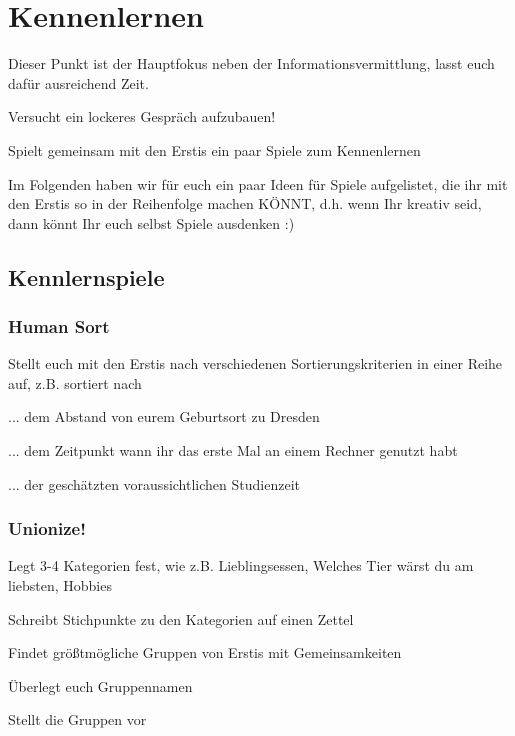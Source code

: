 \documentclass[a4paper,12pt]{report}
\begin{document}
\section{Kennenlernen}
\begin{itemize*}
	\item Dieser Punkt ist der Hauptfokus neben der Informationsvermittlung, lasst euch dafür ausreichend Zeit.
	\item Versucht ein lockeres Gespräch aufzubauen!
	\item Spielt gemeinsam mit den Erstis ein paar Spiele zum Kennenlernen 
	\item Im Folgenden haben wir für euch ein paar Ideen für Spiele aufgelistet, die ihr mit den Erstis so in der Reihenfolge machen KÖNNT, d.h. wenn Ihr kreativ seid, dann könnt Ihr euch selbst Spiele ausdenken :)
\end{itemize*}


\subsection{Kennlernspiele}

\subsubsection{Human Sort} 
\begin{itemize*} 
	\item Stellt euch mit den Erstis nach verschiedenen Sortierungskriterien in einer Reihe auf, z.B. sortiert nach
	\item ... dem Abstand von eurem Geburtsort zu Dresden 
	\item ... dem Zeitpunkt wann ihr das erste Mal an einem Rechner genutzt habt
	\item ... der geschätzten voraussichtlichen Studienzeit 
\end{itemize*} 

\subsubsection{Unionize!}
\begin{itemize*}
	\item Legt 3-4 Kategorien fest, wie z.B. Lieblingsessen, Welches Tier wärst du am liebsten, Hobbies
	\item Schreibt Stichpunkte zu den Kategorien auf einen Zettel
	\item Findet größtmögliche Gruppen von Erstis mit Gemeinsamkeiten
	\item Überlegt euch Gruppennamen
	\item Stellt die Gruppen vor
\end{itemize*}
\end{document}
